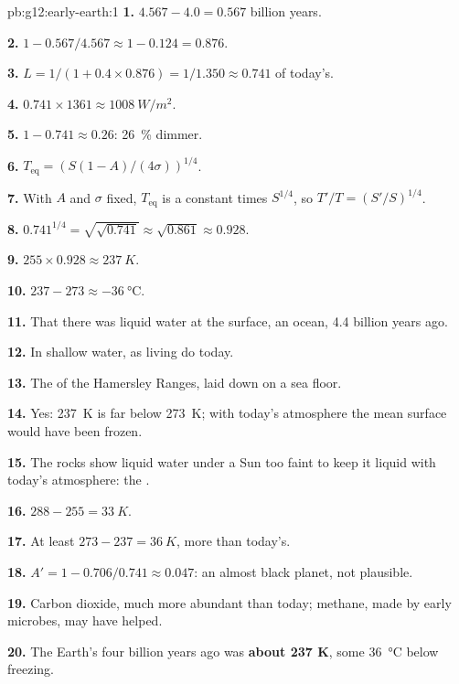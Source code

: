 \begin{solution}{pb:g12:early-earth:1}
\textbf{1.} $4.567 - 4.0 = 0.567$ billion years.

\textbf{2.} $1 - 0.567/4.567 \approx 1 - 0.124 = 0.876$.

\textbf{3.} $L = 1/(1 + 0.4 \times 0.876) = 1/1.350 \approx 0.741$ of
today's.

\textbf{4.} $0.741 \times 1361 \approx \qty{1008}{W/m^2}$.

\textbf{5.} $1 - 0.741 \approx 0.26$: \qty{26}{\percent} dimmer.

\textbf{6.} $T_{\mathrm{eq}} = \left(S(1-A)/(4\sigma)\right)^{1/4}$.

\textbf{7.} With $A$ and $\sigma$ fixed, $T_{\mathrm{eq}}$ is a constant times
$S^{1/4}$, so $T'/T = (S'/S)^{1/4}$.

\textbf{8.} $0.741^{1/4} = \sqrt{\sqrt{0.741}} \approx \sqrt{0.861} \approx
0.928$.

\textbf{9.} $255 \times 0.928 \approx \qty{237}{K}$.

\textbf{10.} $237 - 273 \approx \qty{-36}{\celsius}$.

\textbf{11.} That there was liquid water at the surface, an ocean, 4.4
billion years ago.

\textbf{12.} In shallow water, as living  do today.

\textbf{13.} The  of the Hamersley Ranges, laid down
on a sea floor.

\textbf{14.} Yes: \qty{237}{K} is far below \qty{273}{K}; with today's
atmosphere the mean surface would have been frozen.

\textbf{15.} The rocks show liquid water under a Sun too faint to keep it
liquid with today's atmosphere: the .

\textbf{16.} $288 - 255 = \qty{33}{K}$.

\textbf{17.} At least $273 - 237 = \qty{36}{K}$, more than today's.

\textbf{18.} $A' = 1 - 0.706/0.741 \approx 0.047$: an almost black planet,
not plausible.

\textbf{19.} Carbon dioxide, much more abundant than today; methane, made by
early microbes, may have helped.

\textbf{20.} The Earth's  four billion years ago was
\textbf{about 237 K}, some \qty{36}{\celsius} below freezing.
\end{solution}
